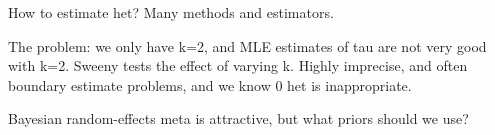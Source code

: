 \begin{outline}
\1 How to estimate het?
    \2 Many methods and estimators.

    \2 The problem: we only have k=2, and MLE estimates of tau are not very good with k=2.
        \3 Sweeny tests the effect of varying k.
        \3 Highly imprecise, and often boundary estimate problems, and we know 0 het is inappropriate.

\1 Bayesian random-effects meta is attractive, but what priors should we use?

\end{outline}

